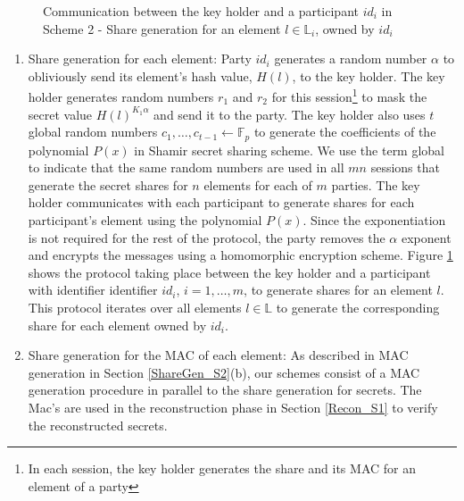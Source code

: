 \begin{figure}[h!]
   \caption{Communication between the key holder and a participant $id_i$ in Scheme 2 - Share generation for an element $l \in \mathbb{L}_i$, owned by $id_i$}
   \label{fig:S1_ShareGen}
\end{figure}
\begin{enumerate}[label=(\alph*)]
    \item Share generation for each element: Party $id_i$ generates a random number $\alpha$ to obliviously send its element's hash value, $H(l)$, to the key holder. The key holder generates random numbers $r_1$ and $r_2$ for this session\footnote{In each session, the key holder generates the share and its MAC for an element of a party} to mask the secret value $H(l)^{K_1 \alpha}$ and send it to the party. The key holder also uses $t$ global random numbers $c_1, \dots, c_{t-1} \gets \mathbb{F}_p$ to generate the coefficients of the polynomial $P(x)$ in Shamir secret sharing scheme. We use the term global to indicate that the same random numbers are used in all $mn$ sessions that generate the secret shares for $n$ elements for each of $m$ parties. The key holder communicates with each participant to generate shares for each participant's element using the polynomial $P(x)$. Since the exponentiation is not required for the rest of the protocol, the party removes the $\alpha$ exponent and encrypts the messages using a homomorphic encryption scheme. Figure \ref{fig:S1_ShareGen} shows the protocol taking place between the key holder and a participant with identifier identifier $id_i$, $i =1, \dots, m$, to generate shares for an element $l$. This protocol iterates over all elements $l \in \mathbb{L}$ to generate the corresponding share for each element owned by $id_i$.
    \item Share generation for the MAC of each element: As described in MAC generation in Section \ref{ShareGen_S2}(b), our schemes consist of a MAC generation procedure in parallel to the share generation for secrets. The Mac's are used in the reconstruction phase in Section \ref{Recon_S1} to verify the reconstructed secrets. 
\end{enumerate}

